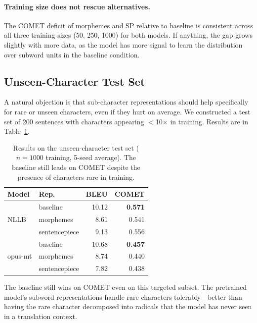 \documentclass[11pt]{article}
\begin{document}
\paragraph{Training size does not rescue alternatives.}
The COMET deficit of morphemes and SP relative to baseline is consistent across all three training sizes (50, 250, 1000) for both models. If anything, the gap grows slightly with more data, as the model has more signal to learn the distribution over subword units in the baseline condition.

\subsection{Unseen-Character Test Set}

A natural objection is that sub-character representations should help specifically for rare or unseen characters, even if they hurt on average. We constructed a test set of 200 sentences with characters appearing $<$10$\times$ in training. Results are in Table~\ref{tab:unseen}.

\begin{table}[t]
\centering
\small
\begin{tabular}{llrr}
\toprule
\textbf{Model} & \textbf{Rep.} & \textbf{BLEU} & \textbf{COMET} \\
\midrule
\multirow{3}{*}{NLLB}
 & baseline      & 10.12 & \textbf{0.571} \\
 & morphemes     &  8.61 & 0.541 \\
 & sentencepiece &  9.13 & 0.556 \\
\midrule
\multirow{3}{*}{opus-mt}
 & baseline      & 10.68 & \textbf{0.457} \\
 & morphemes     &  8.74 & 0.440 \\
 & sentencepiece &  7.82 & 0.438 \\
\bottomrule
\end{tabular}
\caption{Results on the unseen-character test set ($n=1000$ training, 5-seed average). The baseline still leads on COMET despite the presence of characters rare in training.}
\label{tab:unseen}
\end{table}

The baseline still wins on COMET even on this targeted subset. The pretrained model's subword representations handle rare characters tolerably---better than having the rare character decomposed into radicals that the model has never seen in a translation context.

\end{document}
